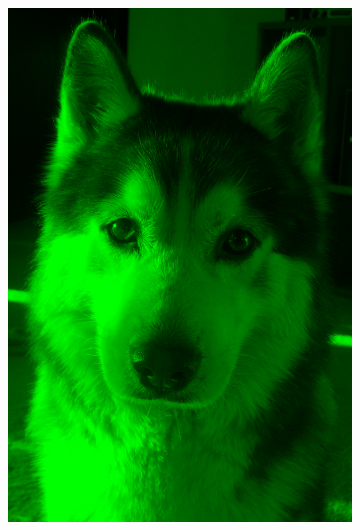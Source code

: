 \documentclass[12pt,utf8]{beamer}
\begin{document}
\begin{frame}
\begin{figure}
\begin{subfigure}[b]{0.3\textwidth}
				\includegraphics[scale=0.07]{resources/doggo_green.jpg}
				

\end{subfigure}
\end{figure}
\end{frame}
\end{document}
